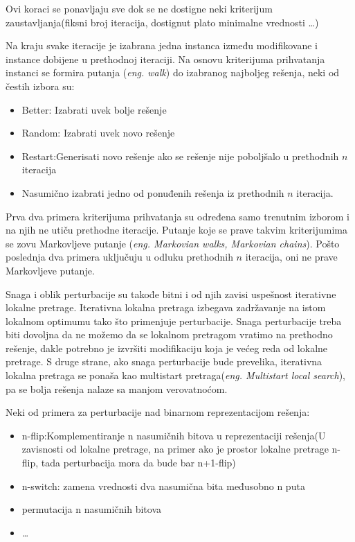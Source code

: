 \documentclass[a4paper]{article}
\begin{document}
Ovi koraci se ponavljaju sve dok se ne dostigne neki kriterijum zaustavljanja(fiksni broj iteracija, dostignut plato minimalne vrednosti \ldots)

Na kraju svake iteracije je izabrana jedna instanca između modifikovane i instance dobijene u prethodnoj iteraciji. Na osnovu kriterijuma prihvatanja instanci se formira putanja (\emph{eng. walk}) do izabranog najboljeg rešenja, neki od čestih izbora su:
\begin{itemize}
\item Better: Izabrati uvek bolje rešenje
\item Random: Izabrati uvek novo rešenje
\item Restart:Generisati novo rešenje ako se rešenje nije poboljšalo u prethodnih $n$ iteracija
\item Nasumično izabrati jedno od ponuđenih rešenja iz prethodnih $n$ iteracija.
\end{itemize}

Prva dva primera kriterijuma prihvatanja su određena samo trenutnim izborom i na njih ne utiču prethodne iteracije. Putanje koje se prave takvim kriterijumima se zovu Markovljeve putanje (\emph{eng. Markovian walks, Markovian chains}). Pošto poslednja dva primera uključuju u odluku prethodnih $n$ iteracija, oni ne prave Markovljeve putanje. 

Snaga i oblik perturbacije su takođe bitni i od njih zavisi uspešnost iterativne lokalne pretrage. Iterativna lokalna pretraga izbegava zadržavanje na istom lokalnom optimumu tako što primenjuje perturbacije. Snaga perturbacije treba biti dovoljna da ne možemo da se lokalnom pretragom vratimo na prethodno rešenje, dakle potrebno je izvršiti modifikaciju koja je većeg reda od lokalne pretrage. S druge strane, ako snaga perturbacije bude prevelika, iterativna lokalna pretraga se ponaša kao multistart pretraga(\emph{eng. Multistart local search}), pa se bolja rešenja nalaze sa manjom verovatnoćom. 

Neki od primera za perturbacije nad binarnom reprezentacijom rešenja:
\begin{itemize}
\item n-flip:Komplementiranje n nasumičnih bitova u reprezentaciji rešenja(U zavisnosti od lokalne pretrage, na primer
ako je prostor lokalne pretrage n-flip, tada perturbacija mora da bude bar n+1-flip)
\item n-switch: zamena vrednosti dva nasumična bita međusobno n puta
\item permutacija n nasumičnih bitova
\item \ldots
\end{itemize}
\end{document}
